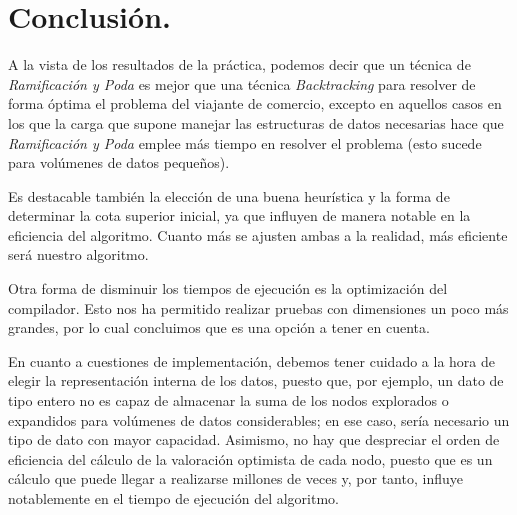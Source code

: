 \documentclass[11pt,a4paper]{article}
\begin{document}
	\section{Conclusión.}

		\par
		A la vista de los resultados de la práctica, podemos decir que un técnica de \textit{Ramificación y Poda} es mejor que una técnica \textit{Backtracking} para resolver de forma óptima el problema del viajante de comercio, excepto en aquellos casos en los que la carga que supone manejar las estructuras de datos necesarias hace que \textit{Ramificación y Poda} emplee más tiempo en resolver el problema (esto sucede para volúmenes de datos pequeños).

		\par
		Es destacable también la elección de una buena heurística y la forma de determinar la cota superior inicial, ya que influyen de manera notable en la eficiencia del algoritmo. Cuanto más se ajusten ambas a la realidad, más eficiente será nuestro algoritmo.

		\par
		Otra forma de disminuir los tiempos de ejecución es la optimización del compilador. Esto nos ha permitido realizar pruebas con dimensiones un poco más grandes, por lo cual concluimos que es una opción a tener en cuenta.

		\par
		En cuanto a cuestiones de implementación, debemos tener cuidado a la hora de elegir la representación interna de los datos, puesto que, por ejemplo, un dato de tipo entero no es capaz de almacenar la suma de los nodos explorados o expandidos para volúmenes de datos considerables; en ese caso, sería necesario un tipo de dato con mayor capacidad. Asimismo, no hay que despreciar el orden de eficiencia del cálculo de la valoración optimista de cada nodo, puesto que es un cálculo que puede llegar a realizarse millones de veces y, por tanto, influye notablemente en el tiempo de ejecución del algoritmo.
\end{document}
